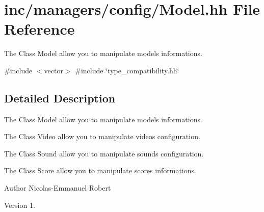 \hypertarget{Model_8hh}{}\section{inc/managers/config/\+Model.hh File Reference}
\label{Model_8hh}


The Class Model allow you to manipulate model\textquotesingle{}s informations.  


{\ttfamily \#include $<$vector$>$}\newline
{\ttfamily \#include \char`\"{}type\+\_\+compatibility.\+hh\char`\"{}}\newline


\subsection{Detailed Description}
The Class Model allow you to manipulate model\textquotesingle{}s informations. 

The Class Video allow you to manipulate video\textquotesingle{}s configuration.

The Class Sound allow you to manipulate sound\textquotesingle{}s configuration.

The Class Score allow you to manipulate score\textquotesingle{}s informations.

\begin{DoxyAuthor}{Author}
Nicolas-\/\+Emmanuel Robert 
\end{DoxyAuthor}
\begin{DoxyVersion}{Version}
1. 
\end{DoxyVersion}
